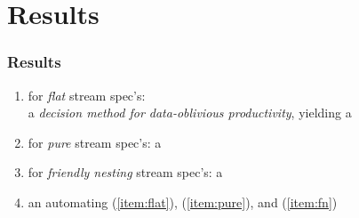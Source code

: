 \documentclass[10pt]{beamer}
\begin{document}
\section{Results}


\begin{frame}%
  \frametitle{Results}

\begin{enumerate}
  \item \label{item:flat}
    for \emph{flat} stream spec's:\\ a 
    \emph{decision method for data-oblivious productivity},
    yielding a
    \vspace*{0.15ex}
  \item \label{item:pure}
    for \emph{pure} stream spec's: 
    a  
    \vspace*{0.15ex}
  \item \label{item:fn}
    for \emph{friendly nesting} stream spec's: 
    a 
    \vspace*{0.15ex}
  \item an  automating (\ref{item:flat}),
    (\ref{item:pure}), and (\ref{item:fn}) 
\end{enumerate}

\vspace*{-0.75ex}
%
\begin{center}
\end{center}

\end{frame}%

\end{document}

